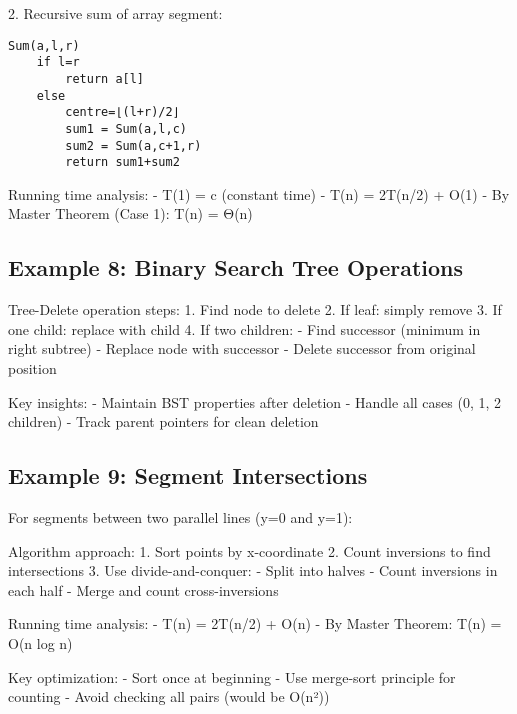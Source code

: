 2. Recursive sum of array segment:
\begin{verbatim}
Sum(a,l,r)
    if l=r
        return a[l]
    else
        centre=⌊(l+r)/2⌋
        sum1 = Sum(a,l,c)
        sum2 = Sum(a,c+1,r)
        return sum1+sum2
\end{verbatim}
Running time analysis:
- T(1) = c (constant time)
- T(n) = 2T(n/2) + O(1)
- By Master Theorem (Case 1): T(n) = Θ(n)

\subsection*{Example 8: Binary Search Tree Operations}

Tree-Delete operation steps:
1. Find node to delete
2. If leaf: simply remove
3. If one child: replace with child
4. If two children:
   - Find successor (minimum in right subtree)
   - Replace node with successor
   - Delete successor from original position

Key insights:
- Maintain BST properties after deletion
- Handle all cases (0, 1, 2 children)
- Track parent pointers for clean deletion

\subsection*{Example 9: Segment Intersections}

For segments between two parallel lines (y=0 and y=1):

Algorithm approach:
1. Sort points by x-coordinate
2. Count inversions to find intersections
3. Use divide-and-conquer:
   - Split into halves
   - Count inversions in each half
   - Merge and count cross-inversions

Running time analysis:
- T(n) = 2T(n/2) + O(n)
- By Master Theorem: T(n) = O(n log n)

Key optimization:
- Sort once at beginning
- Use merge-sort principle for counting
- Avoid checking all pairs (would be O(n²))
